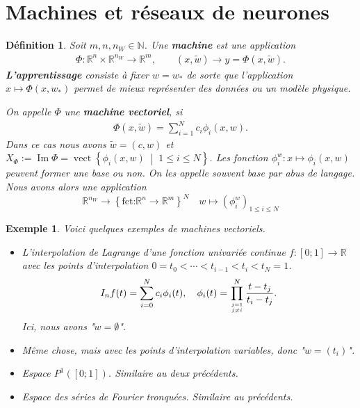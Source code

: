 \documentclass[11pt,a4paper]{article}
\newcommand{\nparammodel}{n_W}
\newcommand{\N}{\mathbb N}
\newcommand{\R}{\mathbb R}
\newcommand{\Set}[1]{\left\{#1\right\}}
\newcommand{\vect}[2]{\operatorname{vect}\left\{#1\;\middle|\;#2\right\}}
\newcommand{\im}{\operatorname{Im}}
\newtheorem{definition}[theorem]{Définition}
\newtheorem{example}[theorem]{Exemple}
\begin{document}
\section{Machines et réseaux de neurones}\label{sec:}
%
%
\begin{definition}\label{definition:}
Soit $m,n,\nparammodel\in\N$. Une \textbf{machine} est une application 
\begin{align*}
\Phi:\R^n\times \R^{\nparammodel}\to \R^m,\qquad (x,\tilde w)\to y = \Phi(x,\tilde w).
\end{align*}
\textbf{L'apprentissage} consiste à fixer $w=w_*$ de sorte que l'application $x\mapsto \Phi(x,w_*)$ permet de mieux représenter des données ou un modèle physique.

On appelle $\Phi$ une \textbf{machine vectoriel}, si
\begin{align*}
\Phi(x,\tilde w) = \sum_{i=1}^N c_i \phi_i(x,w).
\end{align*}
Dans ce cas nous avons $\tilde w = (c,w)$ et $X_{\Phi}:=\im\Phi =\vect{\phi_i(x,w)}{1\le i\le N}$.
Les fonction $\phi_i^{w} : x\mapsto \phi_i(x,w)$ peuvent former une base ou non. On les appelle souvent base par abus de langage. 
Nous avons alors une application
%
\begin{equation}\label{equation:}
\R^{\nparammodel}\to \Set{\mbox{fct:} \R^n\to \R^m}^N\quad w\mapsto (\phi_i^{w})_{1\le i\le N}
\end{equation}
%
%
\end{definition}
%
%
\begin{example}\label{example:}
Voici quelques exemples de machines vectoriels.
\begin{itemize}
\item L'interpolation de Lagrange d'une fonction univariée continue $f:[0;1]\to\R$ avec les points d'interpolation $0 = t_0 < \cdots < t_{i-1}<t_{i} < t_N=1$.
\begin{align*}
I_n f(t) = \sum_{i=0}^N c_i \phi_i(t),\quad \phi_i(t)=\prod_{j=1\atop j\ne i}^{N} \frac{t-t_j}{t_i-t_j}.
\end{align*}
Ici, nous avons "$w=\emptyset$".
\item Même chose, mais avec les points d'interpolation variables, donc "$w=(t_i)$".
\item Espace $P^1([0;1])$. Similaire au deux précédents.
\item Espace des séries de Fourier tronquées. Similaire au précédents.
\end{itemize}
\end{example}
\end{document}
